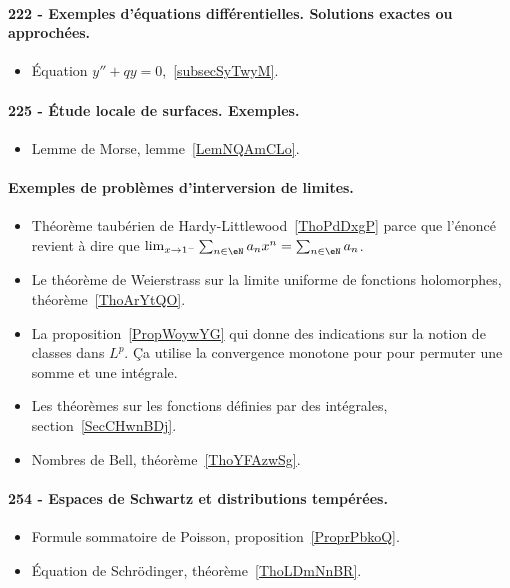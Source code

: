 \paragraph{222 - Exemples d’équations différentielles. Solutions exactes ou approchées.}
\begin{itemize}
    \item Équation \( y''+qy=0\),~\ref{subsecSyTwyM}.
\end{itemize}
\paragraph{225 - Étude locale de surfaces. Exemples.}
\begin{itemize}
    \item Lemme de Morse, lemme~\ref{LemNQAmCLo}.
\end{itemize}
\paragraph{Exemples de problèmes d’interversion de limites.}
\begin{itemize}
    \item Théorème taubérien de Hardy-Littlewood~\ref{ThoPdDxgP} parce que l'énoncé revient à dire que \( \lim_{x\to 1^-} \sum_{n\in \eN}a_nx^n=\sum_{n\in \eN}a_n\).
    \item Le théorème de Weierstrass sur la limite uniforme de fonctions holomorphes, théorème~\ref{ThoArYtQO}.
    \item La proposition~\ref{PropWoywYG} qui donne des indications sur la notion de classes dans \( L^p\). Ça utilise la convergence monotone pour  pour permuter une somme et une intégrale.
    \item Les théorèmes sur les fonctions définies par des intégrales, section~\ref{SecCHwnBDj}.
    \item Nombres de Bell, théorème~\ref{ThoYFAzwSg}.
\end{itemize}
\paragraph{254 - Espaces de Schwartz et distributions tempérées.}
\begin{itemize}
    \item Formule sommatoire de Poisson, proposition~\ref{ProprPbkoQ}.
    \item Équation de Schrödinger, théorème~\ref{ThoLDmNnBR}.
\end{itemize}

